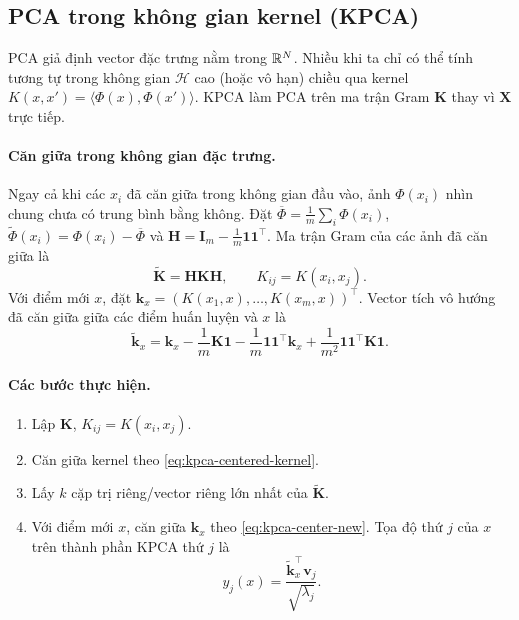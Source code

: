 \subsection{PCA trong không gian kernel (KPCA)}
\label{sec:kpca}

PCA giả định vector đặc trưng nằm trong $\mathbb{R}^N$. Nhiều khi ta chỉ có thể tính tương tự trong không gian $\mathcal{H}$ cao (hoặc vô hạn) chiều qua kernel $K(x,x') = \langle \Phi(x), \Phi(x')\rangle$. KPCA làm PCA trên ma trận Gram $\mathbf{K}$ thay vì $\mathbf{X}$ trực tiếp.

\paragraph{Căn giữa trong không gian đặc trưng.}
Ngay cả khi các $x_i$ đã căn giữa trong không gian đầu vào, ảnh
$\Phi(x_i)$ nhìn chung chưa có trung bình bằng không. Đặt
$\overline{\Phi}=\frac{1}{m}\sum_i\Phi(x_i)$,
$\widetilde{\Phi}(x_i)=\Phi(x_i)-\overline{\Phi}$ và
$\mathbf{H}=\mathbf{I}_m-\frac{1}{m}\mathbf{1}\mathbf{1}^\top$.
Ma trận Gram của các ảnh đã căn giữa là
\begin{equation}
  \widetilde{\mathbf{K}}=\mathbf{H}\mathbf{K}\mathbf{H},
  \qquad K_{ij}=K(x_i,x_j).
  \label{eq:kpca-centered-kernel}
\end{equation}
Với điểm mới $x$, đặt
$\mathbf{k}_x=(K(x_1,x),\ldots,K(x_m,x))^\top$. Vector tích vô hướng
đã căn giữa giữa các điểm huấn luyện và $x$ là
\begin{equation}
 \widetilde{\mathbf{k}}_x
 =\mathbf{k}_x-\frac{1}{m}\mathbf{K}\mathbf{1}
 -\frac{1}{m}\mathbf{1}\mathbf{1}^\top\mathbf{k}_x
 +\frac{1}{m^2}\mathbf{1}\mathbf{1}^\top\mathbf{K}\mathbf{1}.
 \label{eq:kpca-center-new}
\end{equation}

\paragraph{Các bước thực hiện.}
\begin{enumerate}
  \item Lập $\mathbf{K}$, $K_{ij} = K(x_i, x_j)$.
  \item Căn giữa kernel theo \eqref{eq:kpca-centered-kernel}.
  \item Lấy $k$ cặp trị riêng/vector riêng lớn nhất của $\tilde{\mathbf{K}}$.
  \item Với điểm mới $x$, căn giữa $\mathbf{k}_x$ theo \eqref{eq:kpca-center-new}. Tọa độ thứ $j$ của $x$ trên thành phần KPCA thứ $j$ là
  \[
  y_j(x)=\frac{\widetilde{\mathbf{k}}_x^\top \mathbf{v}_j}{\sqrt{\lambda_j}}.
  \]
\end{enumerate}

